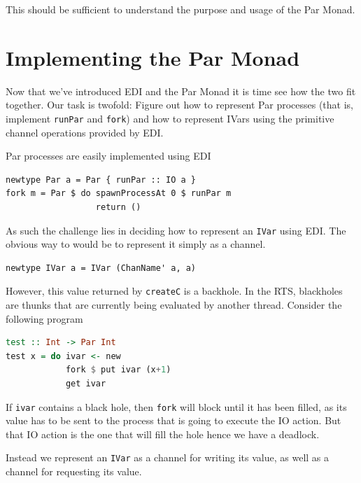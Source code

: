 \documentclass[a4paper, oneside, final]{article}
\begin{document}
This should be sufficient to understand the purpose and usage of the
Par Monad.

\newpage

\section{Implementing the Par Monad}

Now that we've introduced EDI and the Par Monad it is time see how 
the two fit together. Our task is twofold: Figure out how to 
represent Par processes (that is, implement \texttt{runPar} and 
\texttt{fork}) and how to represent IVars using the primitive
channel operations provided by EDI.

Par processes are easily implemented using EDI \newline

\begin{lstlisting}
newtype Par a = Par { runPar :: IO a }
fork m = Par $ do spawnProcessAt 0 $ runPar m
                  return ()
\end{lstlisting}

As such the challenge lies in deciding how to represent an \texttt{IVar}
using EDI. The obvious way to would be to represent it simply as a
channel. \newline

\begin{lstlisting}
newtype IVar a = IVar (ChanName' a, a)
\end{lstlisting}

However, this value returned by \texttt{createC} is a backhole. In 
the RTS, blackholes are thunks that are currently being evaluated by
another thread. Consider the following program \newline 

\begin{lstlisting}[language=Haskell]
test :: Int -> Par Int
test x = do ivar <- new
            fork $ put ivar (x+1)
            get ivar
\end{lstlisting}

If \texttt{ivar} contains a black hole, then \texttt{fork} will block
until it has been filled, as its value has to be sent to the process
that is going to execute the IO action.  But that IO action is the one
that will fill the hole hence we have a deadlock.

Instead we represent an \texttt{IVar} as a channel for writing its
value, as well as a channel for requesting its value. \newline
\end{document}
